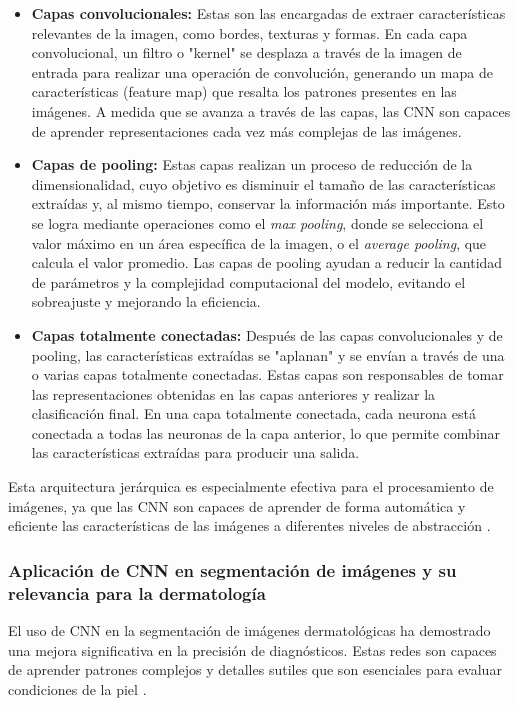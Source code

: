 \begin{itemize}
    \item \textbf{Capas convolucionales:} Estas son las encargadas de extraer características relevantes de la imagen, como bordes, texturas y formas. En cada capa convolucional, un filtro o "kernel" se desplaza a través de la imagen de entrada para realizar una operación de convolución, generando un mapa de características (feature map) que resalta los patrones presentes en las imágenes. A medida que se avanza a través de las capas, las CNN son capaces de aprender representaciones cada vez más complejas de las imágenes.
    
    \item \textbf{Capas de pooling:} Estas capas realizan un proceso de reducción de la dimensionalidad, cuyo objetivo es disminuir el tamaño de las características extraídas y, al mismo tiempo, conservar la información más importante. Esto se logra mediante operaciones como el \textit{max pooling}, donde se selecciona el valor máximo en un área específica de la imagen, o el \textit{average pooling}, que calcula el valor promedio. Las capas de pooling ayudan a reducir la cantidad de parámetros y la complejidad computacional del modelo, evitando el sobreajuste y mejorando la eficiencia.
    
    \item \textbf{Capas totalmente conectadas:} Después de las capas convolucionales y de pooling, las características extraídas se "aplanan" y se envían a través de una o varias capas totalmente conectadas. Estas capas son responsables de tomar las representaciones obtenidas en las capas anteriores y realizar la clasificación final. En una capa totalmente conectada, cada neurona está conectada a todas las neuronas de la capa anterior, lo que permite combinar las características extraídas para producir una salida.
\end{itemize}

Esta arquitectura jerárquica es especialmente efectiva para el procesamiento de imágenes, ya que las CNN son capaces de aprender de forma automática y eficiente las características de las imágenes a diferentes niveles de abstracción \parencite{krizhevsky2012}.

\subsubsection{Aplicación de CNN en segmentación de imágenes y su relevancia para la dermatología}
El uso de CNN en la segmentación de imágenes dermatológicas ha demostrado una mejora significativa en la precisión de diagnósticos. Estas redes son capaces de aprender patrones complejos y detalles sutiles que son esenciales para evaluar condiciones de la piel \cite{esteva2017}.

